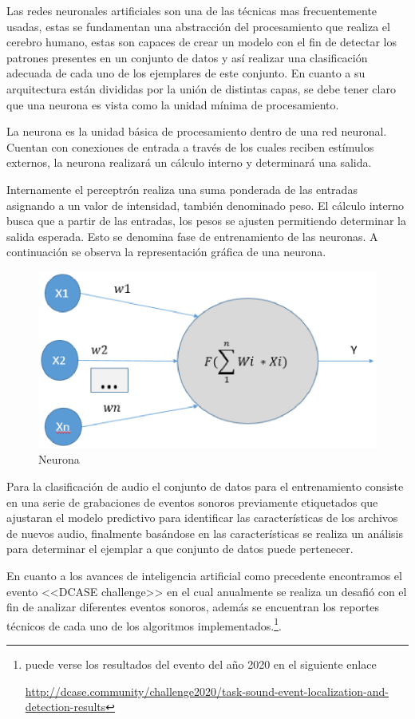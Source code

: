 Las redes neuronales artificiales son una de las técnicas mas frecuentemente usadas, estas se fundamentan una abstracción del procesamiento que realiza el cerebro humano, estas son capaces de crear un modelo con el fin de detectar los patrones presentes en un conjunto de datos y así realizar una clasificación adecuada de cada uno de los ejemplares de este conjunto. En cuanto a su arquitectura están divididas por la unión de distintas capas, se debe tener claro que una neurona es vista como la unidad mínima de procesamiento.

La neurona es la unidad básica de procesamiento dentro de una red neuronal. Cuentan con conexiones de entrada a través de los cuales reciben estímulos externos, la neurona realizará un cálculo interno y determinará una salida. 

Internamente el perceptrón realiza una suma ponderada de las entradas asignando a un valor de intensidad, también denominado peso. El cálculo interno busca que a partir de las entradas, los pesos se ajusten permitiendo determinar la salida esperada. Esto se denomina fase de entrenamiento de las neuronas. A continuación se observa la representación gráfica de una neurona.
 \begin{figure}[H]
    \centering
    \includegraphics[width=0.8\linewidth]{secciones/Imagenes/neurona.eps}
    \caption{Neurona}
\end{figure}


Para la clasificación de audio el conjunto de datos para el entrenamiento consiste en una serie de grabaciones de eventos sonoros previamente etiquetados que ajustaran el modelo predictivo para identificar las características de los archivos de nuevos audio, finalmente basándose en las características se realiza un análisis para determinar el ejemplar a que conjunto de datos puede pertenecer.


En cuanto a los avances de inteligencia artificial como precedente encontramos el evento <<DCASE challenge>>\cite{Dc} en el cual anualmente se realiza un desafió con el fin de analizar diferentes eventos sonoros, además se encuentran los reportes técnicos de cada uno de los algoritmos implementados.\footnote{puede verse los resultados del evento del año  2020 en el siguiente enlace

\url{http://dcase.community/challenge2020/task-sound-event-localization-and-detection-results}
}.


